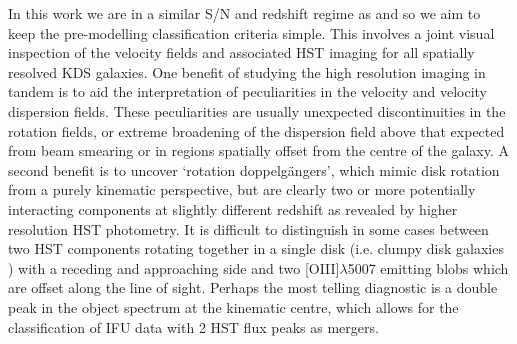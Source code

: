 \documentclass[fleqn,usenatbib]{mn2e}
\begin{document}
In this work we are in a similar S/N and redshift regime as \cite{Gnerucci2011} and so we aim to keep the pre-modelling classification criteria simple.
This involves a joint visual inspection of the velocity fields and associated HST imaging for all spatially resolved KDS galaxies.
One benefit of studying the high resolution imaging in tandem is to aid the interpretation of peculiarities in the velocity and velocity dispersion fields.
These peculiarities are usually unexpected discontinuities in the rotation fields, or extreme broadening of the dispersion field above that expected from beam smearing or in regions spatially offset from the centre of the galaxy.
A second benefit is to uncover `rotation doppelg{\"a}ngers', which mimic disk rotation from a purely kinematic perspective, but are clearly two or more potentially interacting components at slightly different redshift as revealed by higher resolution HST photometry.
It is difficult to distinguish in some cases between two HST components rotating together in a single disk (i.e. clumpy disk galaxies \citep[e.g.][]{Elmegreen2004,Bournaud2007}) with a receding and approaching side and two [OIII]$\lambda$5007 emitting blobs which are offset along the line of sight.
Perhaps the most telling diagnostic is a double peak in the object spectrum at the kinematic centre, which allows for the classification of IFU data with 2 HST flux peaks as mergers.
\end{document}
